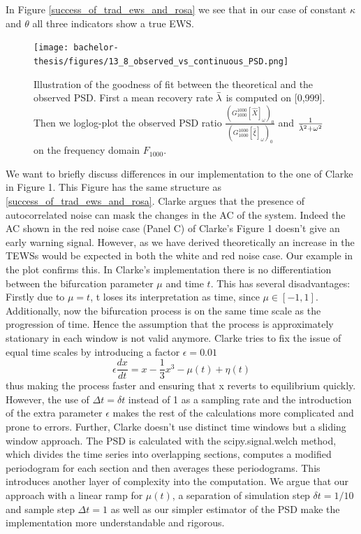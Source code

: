 \documentclass[%
thesis=student,%
coverpage=false,%
titlepage=false,%
headmarks=true, %
english,%
font=libertine, %
math=newpxtx, %
BCOR=5mm,%
coverBCOR=11mm%
]{tumbook}
\begin{document}
In Figure \ref{success_of_trad_ews_and_rosa} we see that in our case of constant $\kappa$ and $\theta$ all three indicators show a true EWS.


\begin{figure}
    \centering
    \texttt{[image: bachelor-thesis/figures/13\_8\_observed\_vs\_continuous\_PSD.png]}
    \caption{Illustration of the goodness of fit between the theoretical and the observed PSD.  First a mean recovery rate $\Bar{\lambda}$ is computed on [0,999]. Then we loglog-plot the observed PSD ratio $\frac{(G_{1000}^{1000}[\widehat{X}]_{\omega})_{0}}{(G_{1000}^{1000}[\widehat{\xi}]_{\omega})_{0}}$ and $\frac{1}{\Bar{\lambda}^2 + \omega^2}$ on the frequency domain $F_{1000}$.}
    \label{observed_vs_continuous_PSD}
\end{figure}


We want to briefly discuss differences in our implementation to the one of Clarke in \cite{Clarke:2023} Figure 1. This Figure has the same structure as \ref{success_of_trad_ews_and_rosa}. Clarke argues that the presence of autocorrelated noise can mask the changes in the AC of the system. Indeed the AC shown in the red noise case (Panel C) of Clarke's Figure 1 doesn't give an early warning signal. However, as we have derived theoretically an increase in the TEWSs would be expected in both the white and red noise case. Our example in the plot confirms this. 
In Clarke's implementation there is no differentiation between the bifurcation parameter $\mu$ and time $t$. This has several disadvantages: Firstly due to $\mu = t$, t loses its interpretation as time, since $\mu \in [-1,1]$. Additionally, now the bifurcation process is on the same time scale as the progression of time. Hence the assumption that the process is approximately stationary in each window is not valid anymore. Clarke tries to fix the issue of equal time scales by introducing a factor $\epsilon = 0.01$
\[
\epsilon\frac{dx}{dt} = x - \frac{1}{3}x^3-\mu(t) + \eta(t)
\]
thus making the process faster and ensuring that x reverts to equilibrium quickly. However, the use of $\Delta t = \delta t$ instead of 1 as a sampling rate and the introduction of the extra parameter $\epsilon$ makes the rest of the calculations more complicated and prone to errors. Further, Clarke doesn't use distinct time windows but a sliding window approach. The PSD is calculated with the scipy.signal.welch method, which divides the time series into overlapping sections, computes a modified periodogram for each section and then averages these periodograms. This introduces another layer of complexity into the computation. 
We argue that our approach with a linear ramp for $\mu(t)$, a separation of simulation step $\delta t = 1/10$ and sample step $\Delta t = 1$ as well as our simpler estimator of the PSD make the implementation more understandable and rigorous.
\end{document}
